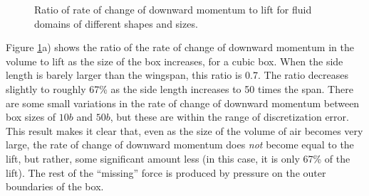 \documentclass[11pt]{article}
\begin{document}
\begin{figure}
\centering

\caption{Ratio of rate of change of downward momentum to lift for fluid domains
         of different shapes and sizes.}
\label{fig:box_momrate}
\end{figure}

Figure \ref{fig:box_momrate}a) shows the ratio of the rate of change of
downward momentum in the volume to lift as the size of the box increases, for a
cubic box. When the side length is barely larger than the wingspan, this ratio
is 0.7. The ratio decreases slightly to roughly 67\% as the side length
increases to 50 times the span. There are some small variations in the rate of
change of downward momentum between box sizes of $10b$ and $50b$, but these are
within the range of discretization error. This result makes it clear that, even
as the size of the volume of air becomes very large, the rate of change of
downward momentum does \textit{not} become equal to the lift, but rather,
some significant amount less (in this case, it is only 67\% of the lift). The
rest of the ``missing'' force is produced by pressure on the outer boundaries
of the box.
\end{document}
